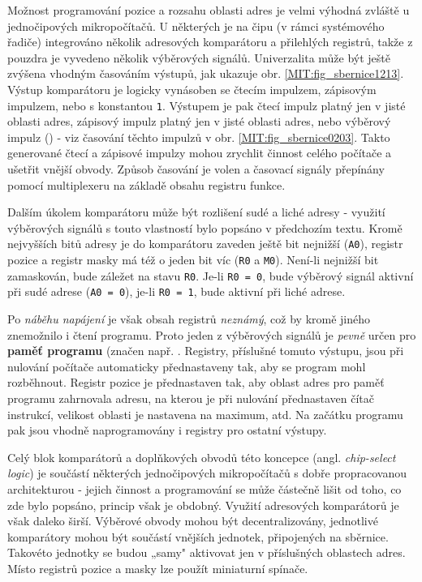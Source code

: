       Možnost programování pozice a rozsahu oblasti adres je velmi výhodná zvláště u jednočipových 
      mikropočítačů. U některých je na čipu (v rámci systémového řadiče) integrováno několik 
      adresových komparátoru a přilehlých registrů, takže z pouzdra je vyvedeno několik výběrových 
      signálů. Univerzalita může být ještě zvýšena vhodným časováním výstupů, jak ukazuje obr. 
      \ref{MIT:fig_sbernice1213}. Výstup komparátoru je logicky vynásoben se čtecím impulzem, 
      zápisovým impulzem, nebo s konstantou \texttt{1}. Výstupem je pak čtecí impulz platný jen v 
      jisté oblasti adres, zápisový impulz platný jen v jisté oblasti adres, nebo výběrový impulz 
      () - viz časování těchto impulzů v obr.      
      \ref{MIT:fig_sbernice0203}. Takto generované čtecí a zápisové impulzy mohou zrychlit činnost 
      celého počítače a ušetřit vnější obvody. Způsob časování je volen a časovací signály 
      přepínány pomocí multiplexeru na základě obsahu registru funkce.
      
      Dalším úkolem komparátoru může být rozlišení sudé a liché adresy - využití výběrových signálů 
      s touto vlastností bylo popsáno v předchozím textu. Kromě nejvyšších bitů adresy je do 
      komparátoru zaveden ještě bit nejnižší (\texttt{A0}), registr pozice a registr masky má též o 
      jeden bit víc (\texttt{R0} a \texttt{M0}). Není-li nejnižší bit zamaskován, bude záležet na 
      stavu \texttt{R0}. Je-li \texttt{R0 = 0}, bude výběrový signál aktivní při sudé adrese 
      (\texttt{A0 = 0}), je-li \texttt{R0 = 1}, bude aktivní při liché adrese.
      
      Po \emph{náběhu napájení} je však obsah registrů \emph{neznámý}, což by kromě jiného 
      znemožnilo i čtení programu. Proto jeden z výběrových signálů je \emph{pevně} určen pro 
      \textbf{paměť programu} (značen např. . Registry, příslušné 
      tomuto výstupu, jsou při nulování počítače automaticky přednastaveny tak, aby se program mohl 
      rozběhnout. Registr pozice je přednastaven tak, aby oblast adres pro paměť programu 
      zahrnovala adresu, na kterou je při nulování přednastaven čítač instrukcí, velikost oblasti 
      je nastavena na maximum, atd. Na začátku programu pak jsou vhodně naprogramovány i registry 
      pro ostatní výstupy.
      
      Celý blok komparátorů a doplňkových obvodů této koncepce (angl. \emph{chip-select logic}) je 
      součástí některých jednočipových mikropočítačů s dobře propracovanou architekturou - jejich 
      činnost a programování se může částečně lišit od toho, co zde bylo popsáno, princip však je 
      obdobný. Využití adresových komparátorů je však daleko širší. Výběrové obvody mohou být 
      decentralizovány, jednotlivé komparátory mohou být součástí vnějších jednotek, připojených na 
      sběrnice. Takovéto jednotky se budou „samy" aktivovat jen v příslušných oblastech adres. 
      Místo registrů pozice a masky lze použít miniaturní spínače.
      

